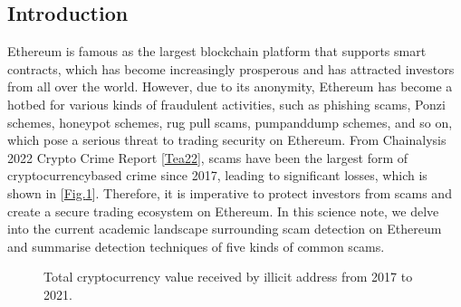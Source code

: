 \documentclass[letterpaper,10pt,english]{jupyterBook}
\begin{document}
\subsection{Introduction}
\label{\detokenize{SDE/ScamDetec:introduction}}
\sphinxAtStartPar
Ethereum is famous as the largest blockchain platform that supports smart contracts, which has become increasingly prosperous and has attracted investors from all over the world. However, due to its anonymity, Ethereum has become a hotbed for various kinds of fraudulent activities, such as phishing scams, Ponzi schemes, honeypot schemes, rug pull scams, pump\sphinxhyphen{}and\sphinxhyphen{}dump schemes, and so on, which pose a serious threat to trading security on Ethereum. From Chainalysis 2022 Crypto Crime Report {[}\hyperlink{cite.SDE/ScamDetec:id144}{Tea22}{]}, scams have been the largest form of cryptocurrency\sphinxhyphen{}based crime since 2017, leading to significant losses, which is shown in {[}\hyperref[\detokenize{SDE/ScamDetec:crypto-value}]{Fig.\@ \ref{\detokenize{SDE/ScamDetec:crypto-value}}}{]}. Therefore, it is imperative to protect investors from scams and create a secure trading ecosystem on Ethereum. In this science note, we delve into the current academic landscape surrounding scam detection on Ethereum and summarise detection techniques of five kinds of common scams.

\begin{figure}[htbp]
\centering
\capstart

\noindent{}
\caption{Total cryptocurrency value received by illicit address from 2017 to 2021.}\label{\detokenize{SDE/ScamDetec:crypto-value}}\end{figure}
\end{document}
